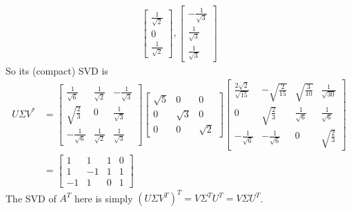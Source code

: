 \begin{Answer}
\begin{align*}
\begin{bmatrix}
\frac{1}{\sqrt{2}}\\ 
0\\ 
\frac{1}{\sqrt{2}}
\end{bmatrix},
\begin{bmatrix}
-\frac{1}{\sqrt{3}}\\ 
\frac{1}{\sqrt{3}}\\ 
\frac{1}{\sqrt{3}}
\end{bmatrix}
\end{align*}
So its (compact) SVD is
\begin{align*}
U\Sigma V^* &= 
\begin{bmatrix}
\frac{1}{\sqrt{6}} & \frac{1}{\sqrt{2}} & -\frac{1}{\sqrt{3}}\\  
\sqrt{\frac{2}{3}} & 0 & \frac{1}{\sqrt{3}}\\   
-\frac{1}{\sqrt{6}} & \frac{1}{\sqrt{2}} & \frac{1}{\sqrt{3}}
\end{bmatrix}
\begin{bmatrix}
\sqrt{5} & 0 & 0 \\
0 & \sqrt{3} & 0 \\
0 & 0 & \sqrt{2}
\end{bmatrix}
\begin{bmatrix}
\frac{2\sqrt{2}}{\sqrt{15}}&-\sqrt{\frac{2}{15}}&\sqrt{\frac{3}{10}}&\frac{1}{\sqrt{30}}\\ 
0&\sqrt{\frac{2}{3}}&\frac{1}{\sqrt{6}}&\frac{1}{\sqrt{6}}\\ 
-\frac{1}{\sqrt{6}}&-\frac{1}{\sqrt{6}}&0&\sqrt{\frac{2}{3}}
\end{bmatrix} \\
&=
\begin{bmatrix}
1&1&1&0\\ 
1&-1&1&1\\ 
-1&1&0&1
\end{bmatrix}
\end{align*}
The SVD of $A^T$ here is simply $(U\Sigma V^T)^T = V\Sigma^TU^T = V\Sigma U^T$.
\end{Answer}

